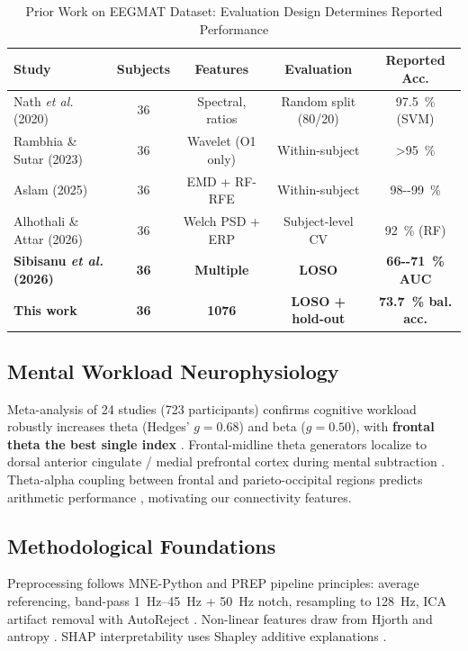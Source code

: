 \documentclass[conference]{IEEEtran}
\begin{document}
\begin{table}[htbp]
\caption{Prior Work on EEGMAT Dataset: Evaluation Design Determines Reported Performance}
\label{tab:prior}
\centering
\begin{tabular}{@{}lcccc@{}}
\toprule
Study & Subjects & Features & Evaluation & Reported Acc. \\
\midrule
Nath \textit{et al.} \cite{nath2020eeg} (2020) & 36 & Spectral, ratios & Random split (80/20) & \SI{97.5}{\%} (SVM) \\
Rambhia \& Sutar \cite{rambhia2023classification} (2023) & 36 & Wavelet (O1 only) & Within-subject & \SI{>95}{\%} \\
Aslam \cite{aslam2025electroencephalograph} (2025) & 36 & EMD + RF-RFE & Within-subject & \SI{98--99}{\%} \\
Alhothali \& Attar \cite{alhothali2026validation} (2026) & 36 & Welch PSD + ERP & Subject-level CV & \SI{92}{\%} (RF) \\
\textbf{Sibisanu \textit{et al.} \cite{sibisanu2026high} (2026)} & \textbf{36} & \textbf{Multiple} & \textbf{LOSO} & \textbf{\SI{66--71}{\%} AUC} \\
\textbf{This work} & \textbf{36} & \textbf{\num{1076}} & \textbf{LOSO + hold-out} & \textbf{\SI{73.7}{\%} bal. acc.} \\
\bottomrule
\end{tabular}
\end{table}

\subsection{Mental Workload Neurophysiology}
Meta-analysis of \num{24} studies (\num{723} participants) confirms cognitive workload robustly increases theta (Hedges' $g = 0.68$) and beta ($g = 0.50$), with \textbf{frontal theta the best single index} \cite{chikhi2022eeg}. Frontal-midline theta generators localize to dorsal anterior cingulate / medial prefrontal cortex during mental subtraction \cite{ishii2014frontal}. Theta-alpha coupling between frontal and parieto-occipital regions predicts arithmetic performance \cite{dimitriadis2016causal}, motivating our connectivity features.

\subsection{Methodological Foundations}
Preprocessing follows MNE-Python \cite{gramfort2013meg} and PREP pipeline \cite{bigdely2015prep} principles: average referencing, band-pass \SIrange{1}{45}{\hertz} + \SI{50}{\hertz} notch, resampling to \SI{128}{\hertz}, ICA artifact removal \cite{makeig1997independent} with AutoReject \cite{jas2017autoreject}. Non-linear features draw from Hjorth \cite{hjorth1970eeg} and antropy \cite{antropy}. SHAP interpretability uses Shapley additive explanations \cite{lundberg2017unified}.
\end{document}
